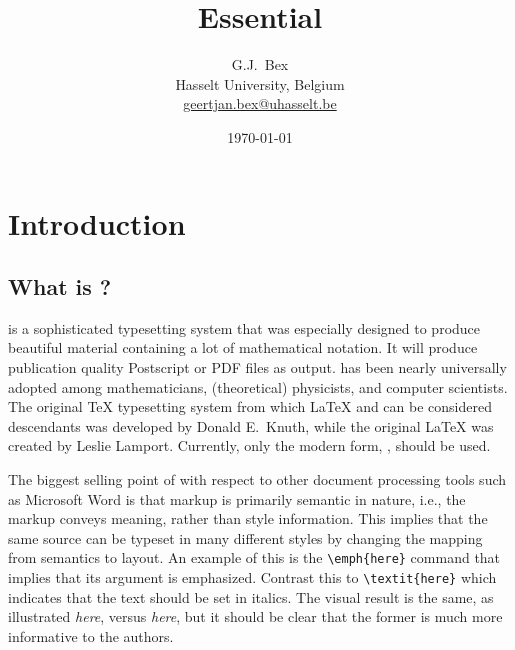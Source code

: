 \documentclass[11pt,a4paper,oneside]{book}
\begin{document}
\newcommand{\tableheader}[1]{\textbf{#1}}
\newcommand{\ientry}[1]{#1\index{#1}}
\newcommand{\imentry}[1]{#1\index{#1|\textbf}}

\frontmatter
\title{Essential \LaTeXe{}}
\author{G.J.\ Bex \\
        Hasselt University, Belgium \\
        \url{geertjan.bex@uhasselt.be}}
\date{\today}

\maketitle
\tableofcontents

\mainmatter

\chapter{Introduction}
\label{ch:intro}

\section{What is \LaTeXe{}?}
\label{sec:what-is-latex}

\LaTeXe{} is a sophisticated typesetting system that was especially designed to produce beautiful material containing a lot of mathematical notation.  It will produce publication quality Postscript or PDF files as output.
\LaTeXe{} has been nearly universally  adopted among mathematicians, (theoretical) physicists, and computer scientists.  The original \TeX{} typesetting system from which \LaTeX{} and \LaTeXe{} can be considered descendants was developed by Donald E.\ Knuth, while the  original \LaTeX{} was created by Leslie Lamport.  Currently, only the modern form, \LaTeXe{}, should be used.

The biggest selling point of \LaTeXe{} with respect to other document processing tools such as Microsoft Word is that markup is primarily semantic in nature, i.e., the markup conveys meaning, rather than style information.  This implies that the same \LaTeXe{} source can be typeset in many different styles by changing the mapping from semantics to layout.
An example of this is the \verb|\emph{here}| command that implies that its argument is emphasized.  Contrast this to \verb|\textit{here}| which indicates that the text should be set in italics.  The visual result is the same, as illustrated \emph{here}, versus \textit{here}, but it should be clear that the former is much more informative to the authors.
\end{document}
